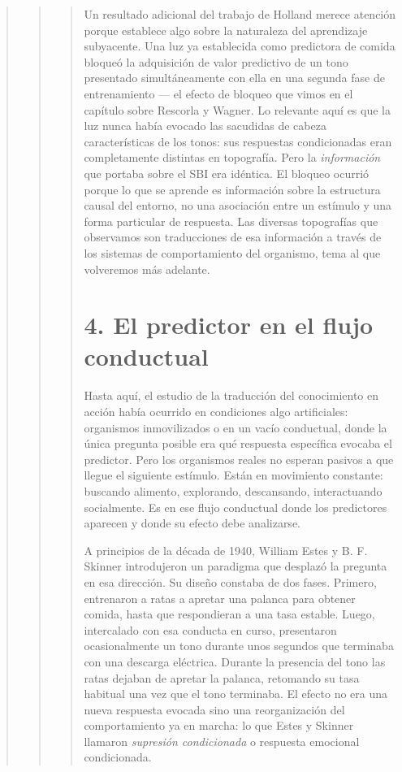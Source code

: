 \documentclass[
  letterpaper,
  DIV=11,
  numbers=noendperiod]{scrreprt}
\begin{document}
\begin{tcolorbox}[enhanced jigsaw, toprule=.15mm, arc=.35mm, colback=white, opacityback=0, colframe=quarto-callout-note-color-frame, breakable, rightrule=.15mm, left=2mm, leftrule=.75mm, bottomrule=.15mm]
\begin{quote}
\begin{quote}
\begin{quote}
Un resultado adicional del trabajo de Holland merece atención porque
establece algo sobre la naturaleza del aprendizaje subyacente. Una luz
ya establecida como predictora de comida bloqueó la adquisición de valor
predictivo de un tono presentado simultáneamente con ella en una segunda
fase de entrenamiento --- el efecto de bloqueo que vimos en el capítulo
sobre Rescorla y Wagner. Lo relevante aquí es que la luz nunca había
evocado las sacudidas de cabeza características de los tonos: sus
respuestas condicionadas eran completamente distintas en topografía.
Pero la \emph{información} que portaba sobre el SBI era idéntica. El
bloqueo ocurrió porque lo que se aprende es información sobre la
estructura causal del entorno, no una asociación entre un estímulo y una
forma particular de respuesta. Las diversas topografías que observamos
son traducciones de esa información a través de los sistemas de
comportamiento del organismo, tema al que volveremos más adelante.

\section{4. El predictor en el flujo
conductual}\label{el-predictor-en-el-flujo-conductual}

Hasta aquí, el estudio de la traducción del conocimiento en acción había
ocurrido en condiciones algo artificiales: organismos inmovilizados o en
un vacío conductual, donde la única pregunta posible era qué respuesta
específica evocaba el predictor. Pero los organismos reales no esperan
pasivos a que llegue el siguiente estímulo. Están en movimiento
constante: buscando alimento, explorando, descansando, interactuando
socialmente. Es en ese flujo conductual donde los predictores aparecen y
donde su efecto debe analizarse.

A principios de la década de 1940, William Estes y B. F. Skinner
introdujeron un paradigma que desplazó la pregunta en esa dirección. Su
diseño constaba de dos fases. Primero, entrenaron a ratas a apretar una
palanca para obtener comida, hasta que respondieran a una tasa estable.
Luego, intercalado con esa conducta en curso, presentaron ocasionalmente
un tono durante unos segundos que terminaba con una descarga eléctrica.
Durante la presencia del tono las ratas dejaban de apretar la palanca,
retomando su tasa habitual una vez que el tono terminaba. El efecto no
era una nueva respuesta evocada sino una reorganización del
comportamiento ya en marcha: lo que Estes y Skinner llamaron
\emph{supresión condicionada} o respuesta emocional condicionada.


\end{quote}
\end{quote}
\end{quote}
\end{tcolorbox}
\end{document}
